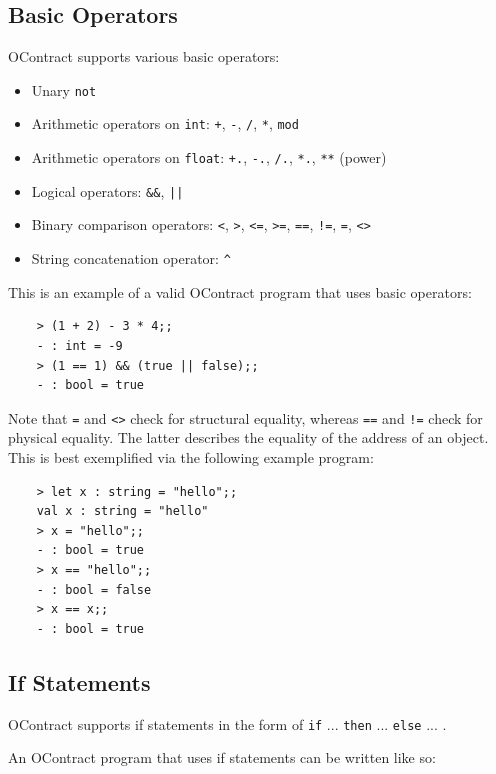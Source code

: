 \documentclass[a4paper]{article}
\begin{document}
\subsection{Basic Operators}

OContract supports various basic operators:

\begin{itemize}
    \item Unary \texttt{not}
    \item Arithmetic operators on \texttt{int}: \texttt{+}, \texttt{-}, \texttt{/}, \texttt{*}, \texttt{mod}
    \item Arithmetic operators on \texttt{float}: \texttt{+.}, \texttt{-.}, \texttt{/.}, \texttt{*.}, \texttt{**} (power)
    \item Logical operators: \texttt{\&\&}, \texttt{||}
    \item Binary comparison operators: \texttt{<}, \texttt{>}, \texttt{<=}, \texttt{>=}, \texttt{==}, \texttt{!=}, \texttt{=}, \texttt{<>}
    \item String concatenation operator: \texttt{\^}
  \end{itemize}

This is an example of a valid OContract program that uses basic operators:

\begin{verbatim}
    > (1 + 2) - 3 * 4;;
    - : int = -9
    > (1 == 1) && (true || false);;
    - : bool = true
\end{verbatim}

Note that \texttt{=} and \texttt{<>} check for structural equality, whereas \texttt{==} and \texttt{!=} check for physical equality.
The latter describes the equality of the address of an object.
This is best exemplified via the following example program:

\begin{verbatim}
    > let x : string = "hello";;
    val x : string = "hello"
    > x = "hello";;
    - : bool = true
    > x == "hello";;
    - : bool = false
    > x == x;;
    - : bool = true
\end{verbatim}

\subsection{If Statements}

OContract supports if statements in the form of \texttt{if} ... \texttt{then} ... \texttt{else} ... .

An OContract program that uses if statements can be written like so:
\end{document}
